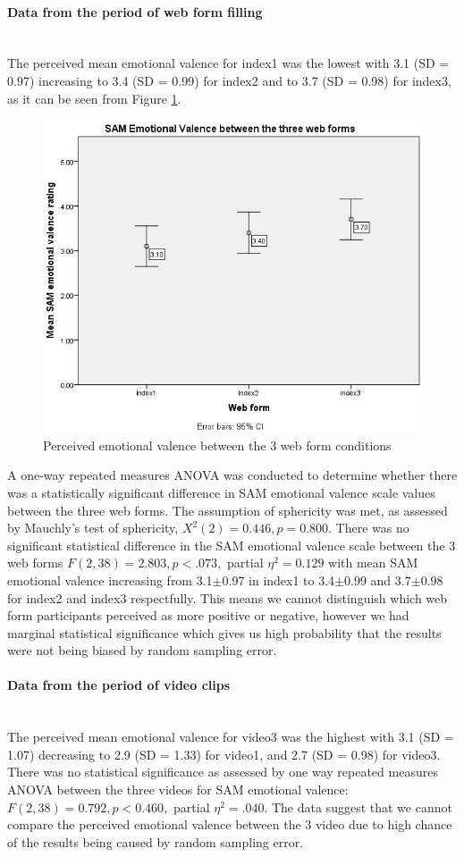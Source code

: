 \documentclass[a4paper]{report}
\begin{document}
			\paragraph{Data from the period of web form filling}\leavevmode\\
				The perceived mean emotional valence for index1 was the lowest with 
				3.1 (SD = 0.97) increasing to 3.4 (SD = 0.99) for index2 and to 3.7 (SD = 0.98) for index3, as it can be seen from Figure \ref{fig:sam-valence-index123}.
				\begin{figure}[h]
					\centering
					\includegraphics[width=0.7\linewidth]{sam-valence-index123}
					\caption[emotional valence between the 3 conditions]{Perceived emotional valence between the 3 web form conditions}
					\label{fig:sam-valence-index123}
				\end{figure}
				A one-way repeated measures ANOVA was conducted to determine whether there was a statistically significant difference in SAM emotional valence scale values between the three web forms. The assumption of sphericity was met, as assessed by Mauchly's test of sphericity, $X^{2}(2) = 0.446, p = 0.800$. There was no significant statistical difference in the SAM emotional valence scale between the 3 web forms  $F(2,38)=2.803, p<.073,$ partial $\eta^{2}=0.129$ with mean SAM emotional valence increasing from 3.1$\pm$0.97 in index1 to 3.4$\pm$0.99 and 3.7$\pm$0.98 for index2 and index3 respectfully. This means we cannot distinguish which web form participants perceived as more positive or negative, however we had marginal statistical significance which gives us high probability that the results were not being biased by random sampling error.	

			\paragraph{Data from the period of video clips}\leavevmode\\
				The perceived mean emotional valence for video3 was the highest with 3.1 (SD = 1.07) decreasing to 2.9 (SD = 1.33) for video1, and 2.7 (SD = 0.98) for video3. There was no statistical significance as assessed by one way repeated measures ANOVA between the three videos for SAM emotional valence: $F(2,38)=0.792, p<0.460,$ partial $\eta^{2}=.040$. The data suggest that we cannot compare the perceived emotional valence between the 3 video due to high chance of the results being caused by random sampling error.
\end{document}
